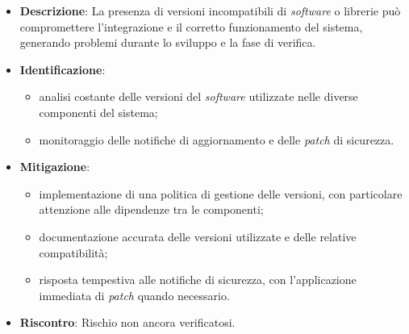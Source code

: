 \label{risk:incompatibilità delle versioni del software}
\begin{itemize}
	\item \textbf{Descrizione}:  La presenza di versioni incompatibili di \textit{software} o librerie 
								può compromettere l'integrazione e il corretto funzionamento del 
								sistema, generando problemi durante lo sviluppo e la fase di verifica.
	\item \textbf{Identificazione}:
	      \begin{itemize}
		      \item analisi costante delle versioni del \textit{software} utilizzate nelle diverse componenti del sistema;
		      
			  \item monitoraggio delle notifiche di aggiornamento e delle \textit{patch} di sicurezza.
	      \end{itemize}

	\item \textbf{Mitigazione}:
	      \begin{itemize}
		      \item implementazione di una politica di gestione delle versioni, 
			  		con particolare attenzione alle dipendenze tra le componenti;

		      \item documentazione accurata delle versioni utilizzate e delle relative compatibilità;
		      
			  \item risposta tempestiva alle notifiche di sicurezza, con l'applicazione immediata di \textit{patch} quando necessario.
	      \end{itemize}
	\item \textbf{Riscontro}: Rischio non ancora verificatosi.
\end{itemize}
